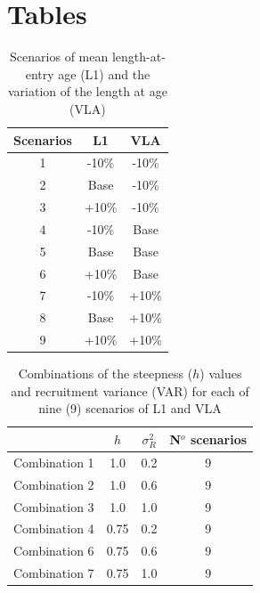 \section{Tables}

\begin{table}[ht]
\centering
\caption{Scenarios of mean length-at-entry age (L1) and the variation of the length at age (VLA) \vspace{0.5cm}}
\label{table1}
\begin{tabular}{c|c|c} \hline
\rowcolor[HTML]{EFEFEF} 
\textbf{Scenarios} & \textbf{L1} & \textbf{VLA} \\ \hline
1                  & -10\%       & -10\%        \\
2                  & Base        & -10\%        \\
3                  & +10\%       & -10\%        \\
4                  & -10\%       & Base         \\
5                  & Base        & Base         \\
6                  & +10\%       & Base         \\
7                  & -10\%       & +10\%        \\
8                  & Base        & +10\%        \\
9                  & +10\%       & +10\%       \\ \hline
\end{tabular}
\end{table}


\begin{table}[h]
\centering
\caption{Combinations of the steepness ($h$) values and recruitment variance (VAR) for each of nine (9) scenarios of L1 and VLA \vspace{0.5cm}}
\label{table2}
\begin{tabular}{c|c|c|c} \hline
\rowcolor[HTML]{EFEFEF} 
              & \textbf{$h$}    & \textbf{$\sigma^2_R$} & \textbf{N$^o$ scenarios} \\ \hline
Combination 1 & 1.0  & 0.2    & 9           \\
Combination 2 & 1.0  & 0.6    & 9           \\
Combination 3 & 1.0  & 1.0    & 9           \\
Combination 4 & 0.75 & 0.2    & 9           \\
Combination 6 & 0.75 & 0.6    & 9           \\
Combination 7 & 0.75 & 1.0    & 9          \\ \hline
\end{tabular}
\end{table}


